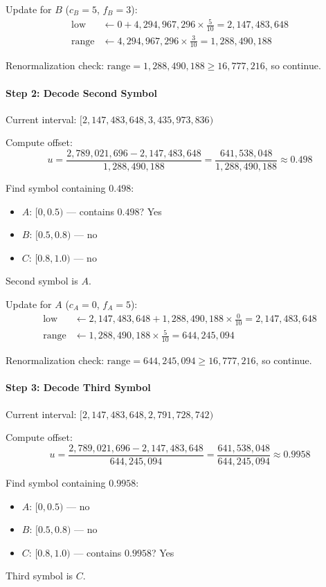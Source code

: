 Update for $B$ ($c_B=5$, $f_B=3$):
\[
\begin{aligned}
\text{low} &\gets 0 + 4{,}294{,}967{,}296 \times \frac{5}{10} = 2{,}147{,}483{,}648 \\
\text{range} &\gets 4{,}294{,}967{,}296 \times \frac{3}{10} = 1{,}288{,}490{,}188
\end{aligned}
\]

Renormalization check: $\text{range} = 1{,}288{,}490{,}188 \ge 16{,}777{,}216$, so continue.

\paragraph{Step 2: Decode Second Symbol}

Current interval: $[2{,}147{,}483{,}648, 3{,}435{,}973{,}836)$

Compute offset:
\[
u = \frac{2{,}789{,}021{,}696 - 2{,}147{,}483{,}648}{1{,}288{,}490{,}188} = \frac{641{,}538{,}048}{1{,}288{,}490{,}188} \approx 0.498
\]

Find symbol containing $0.498$:
\begin{itemize}
    \item $A$: $[0, 0.5)$ — contains $0.498$? Yes
    \item $B$: $[0.5, 0.8)$ — no
    \item $C$: $[0.8, 1.0)$ — no
\end{itemize}
Second symbol is $A$.

Update for $A$ ($c_A=0$, $f_A=5$):
\[
\begin{aligned}
\text{low} &\gets 2{,}147{,}483{,}648 + 1{,}288{,}490{,}188 \times \frac{0}{10} = 2{,}147{,}483{,}648 \\
\text{range} &\gets 1{,}288{,}490{,}188 \times \frac{5}{10} = 644{,}245{,}094
\end{aligned}
\]

Renormalization check: $\text{range} = 644{,}245{,}094 \ge 16{,}777{,}216$, so continue.

\paragraph{Step 3: Decode Third Symbol}

Current interval: $[2{,}147{,}483{,}648, 2{,}791{,}728{,}742)$

Compute offset:
\[
u = \frac{2{,}789{,}021{,}696 - 2{,}147{,}483{,}648}{644{,}245{,}094} = \frac{641{,}538{,}048}{644{,}245{,}094} \approx 0.9958
\]

Find symbol containing $0.9958$:
\begin{itemize}
    \item $A$: $[0, 0.5)$ — no
    \item $B$: $[0.5, 0.8)$ — no
    \item $C$: $[0.8, 1.0)$ — contains $0.9958$? Yes
\end{itemize}
Third symbol is $C$.

